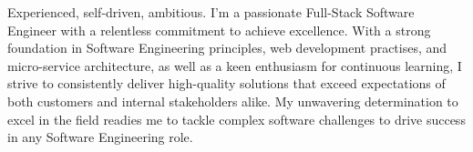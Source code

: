 
\begin{cvparagraph}
Experienced, self-driven, ambitious. I'm a passionate Full-Stack Software Engineer with a relentless commitment to achieve excellence. With a strong foundation in Software Engineering principles, web development practises, and micro-service architecture, as well as a keen enthusiasm for continuous learning, I strive to consistently deliver high-quality solutions that exceed expectations of both customers and internal stakeholders alike. My unwavering determination to excel in the field readies me to tackle complex software challenges to drive success in any Software Engineering role.
\end{cvparagraph}